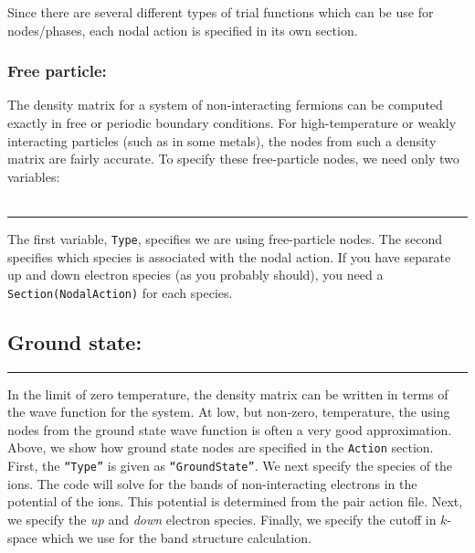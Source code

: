 \documentclass{book}
\begin{document}
Since there are several different types of trial functions which can
be use for nodes/phases, each nodal action is specified in its own
section.  
\subsubsection{Free particle:}
The density matrix for a system of non-interacting fermions can be
computed exactly in free or periodic boundary conditions.  For
high-temperature or weakly interacting particles (such as in some
metals), the nodes from such a density matrix are fairly accurate.  To
specify these free-particle nodes, we need only two variables: \\ \\
\rule{0.6cm}{0cm}
The first variable, \texttt{Type}, specifies we are using
free-particle nodes.  The second specifies which species is associated
with the nodal action.  If you have separate up and down electron
species (as you probably should), you need a
\texttt{Section(NodalAction)} for each species.

\subsection{Ground state:}
\rule{0.0cm}{0.75cm}\rule{0.6cm}{0cm}

In the limit of zero temperature, the density matrix can be written in
terms of the wave function for the system.  At low, but non-zero,
temperature, the using nodes from the ground state wave function is
often a very good approximation.  Above, we show how ground state
nodes are specified in the \texttt{Action} section.  First, the
\texttt{``Type''} is given as \texttt{``GroundState''}.  We next
specify the species of the ions.  The code will solve for the bands of
non-interacting electrons in the potential of the ions.  This
potential is determined from the pair action file.  Next, we specify
the {\em up} and {\em down} electron species.  Finally, we specify the
cutoff in $k$-space which we use for the band structure calculation.
\end{document}
